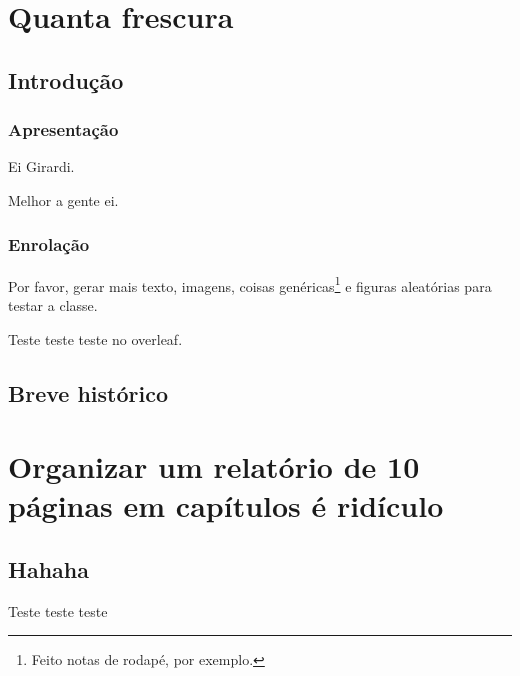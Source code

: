 \documentclass[12pt,openright,oneside,a4paper,english,brazil,oficial]{iaeRT}
\begin{document}
\listoftables*
\cleardoublepage
\tableofcontents*
\cleardoublepage


\textual


\chapter{Quanta frescura}

\section{Introdução}

\subsection{Apresentação}
Ei Girardi.

Melhor a gente ei.

\subsection{Enrolação}
Por favor, gerar mais texto, imagens, coisas genéricas\footnote{Feito notas de rodapé, por exemplo.} e figuras aleatórias para testar a classe.

Teste teste teste no overleaf.

\section{Breve histórico}

\lipsum[0-12]

\chapter{Organizar um relatório de 10 páginas em capítulos é ridículo}

\section{Hahaha}

Teste teste teste
%

\postextual
\end{document}
